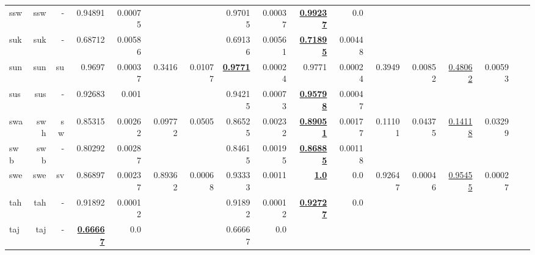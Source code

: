 \documentclass[11pt]{article}
\begin{document}
\begin{table*}[h]
{\begin{tabular}{lrrrrrrrrrrrrrrrr}
ssw         & ssw         & -         & 0.94891         & 0.00075         &          &          & 0.97015         & 0.00037         & \textbf{\underline{0.99237}}         & 0.0         &          &          &          &          \\
suk         & suk         & -         & 0.68712         & 0.00586         &          &          & 0.69136         & 0.00561         & \textbf{\underline{0.71895}}         & 0.00448         &          &          &          &          \\
sun         & sun         & su         & 0.9697         & 0.00037         & 0.3416         & 0.01077         & \textbf{\underline{0.9771}}         & 0.00024         & 0.9771         & 0.00024         & 0.3949         & 0.00852         & \underline{0.48062}         & 0.00593         \\
sus         & sus         & -         & 0.92683         & 0.001         &          &          & 0.94215         & 0.00073         & \textbf{\underline{0.95798}}         & 0.00047         &          &          &          &          \\
swa         & swh         & sw         & 0.85315         & 0.00262         & 0.09772         & 0.0505         & 0.86525         & 0.00232         & \textbf{\underline{0.89051}}         & 0.00177         & 0.11101         & 0.04375         & \underline{0.14118}         & 0.03299         \\
swb         & swb         & -         & 0.80292         & 0.00287         &          &          & 0.84615         & 0.00195         & \textbf{\underline{0.86885}}         & 0.00118         &          &          &          &          \\
swe         & swe         & sv         & 0.86897         & 0.00237         & 0.89362         & 0.00068         & 0.93333         & 0.0011         & \textbf{\underline{1.0}}         & 0.0         & 0.92647         & 0.00046         & \underline{0.95455}         & 0.00027         \\
tah         & tah         & -         & 0.91892         & 0.00012         &          &          & 0.91892         & 0.00012         & \textbf{\underline{0.92727}}         & 0.0         &          &          &          &          \\
taj         & taj         & -         & \textbf{\underline{0.66667}}         & 0.0         &          &          & 0.66667         & 0.0         &          &          &          &          &          &          \\

\end{tabular}}
\end{table*}
\end{document}
